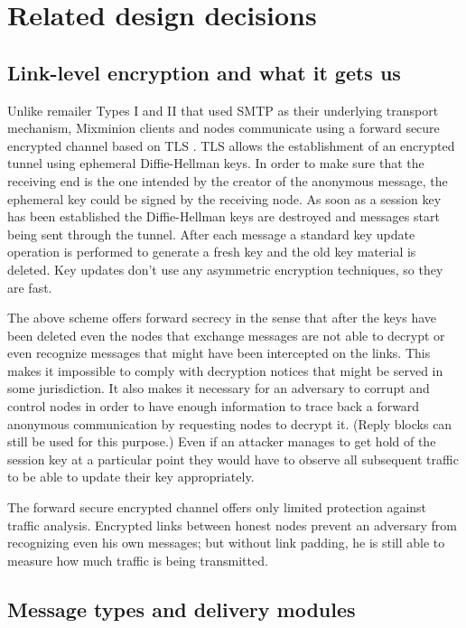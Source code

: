 \documentclass{llncs}
\begin{document}
\section{Related design decisions}

\subsection{Link-level encryption and what it gets us}

Unlike remailer Types I and II that used SMTP as their underlying 
transport mechanism, Mixminion clients and nodes communicate using a
forward secure encrypted channel based on TLS \cite{TLS}.  TLS allows
the establishment of an encrypted tunnel using ephemeral
Diffie-Hellman keys. In order to make sure that the receiving end is
the one intended by the creator of the anonymous message, the
ephemeral key could be signed by the receiving node. As soon as a
session key has been established the Diffie-Hellman keys are destroyed
and messages start being sent through the tunnel. After each message a
standard key update operation is performed to generate a fresh key and
the old key material is deleted. Key updates don't use any asymmetric
encryption techniques, so they are fast.

The above scheme offers forward secrecy in the sense that after the keys
have been deleted even the
nodes that exchange messages are not able to decrypt or even recognize
messages that might have been intercepted on the links. This makes it
impossible to comply with decryption notices that might be served in
some jurisdiction.  It also makes it necessary for an adversary to
corrupt and control nodes in order to have enough information to trace
back a forward anonymous communication by requesting nodes to decrypt
it. (Reply blocks can still be used for this purpose.)  Even if an
attacker manages to get hold of the session key at a particular point
they would have to observe all subsequent traffic to be able to update
their key appropriately.

The forward secure encrypted channel offers only limited protection
against traffic analysis. Encrypted links between honest nodes prevent
an adversary from recognizing even his own messages; but without
link padding, he is still able to measure how much traffic is being
transmitted.

\subsection{Message types and delivery modules}
\label{subsec:delivery-modules}
\end{document}
